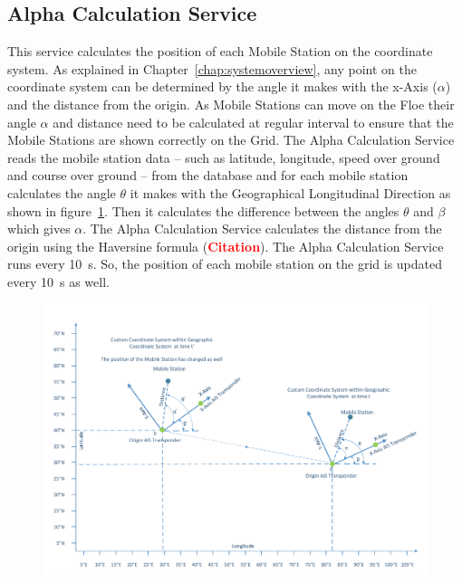 \subsection{Alpha Calculation Service}
\label{sec:sec5_2_4}
\noindent
%
This service calculates the position of each Mobile Station on the coordinate system. As explained in Chapter~\ref{chap:systemoverview}, any point on the coordinate system can be determined by the angle it makes with the x-Axis ($\alpha$) and the distance from the origin. As Mobile Stations can move on the Floe their angle $\alpha$ and distance need to be calculated at regular interval to ensure that the Mobile Stations are shown correctly on the Grid.
\newline
\noindent
The Alpha Calculation Service reads the mobile station data – such as latitude, longitude, speed over ground and course over ground – from the database and for each mobile station calculates the angle $\theta$ it makes with the Geographical Longitudinal Direction as shown in figure~\ref{fig:CH5AlphaCalculationService}. Then it calculates the difference between the angles $\theta$ and $\beta$ which gives $\alpha$. The Alpha Calculation Service calculates the distance from the origin using the Haversine formula (\textbf{\textcolor{red}{Citation}}).
\newline
\noindent 
The Alpha Calculation Service runs every \SI{10}{\second}. So, the position of each mobile station on the grid is updated every \SI{10}{\second} as well.
\begin{figure}[h]
	\centering
	\includegraphics[height=0.45\textheight]{fig05/AlphaCalculationService}
	\label{fig:CH5AlphaCalculationService}
\end{figure}
%
%
